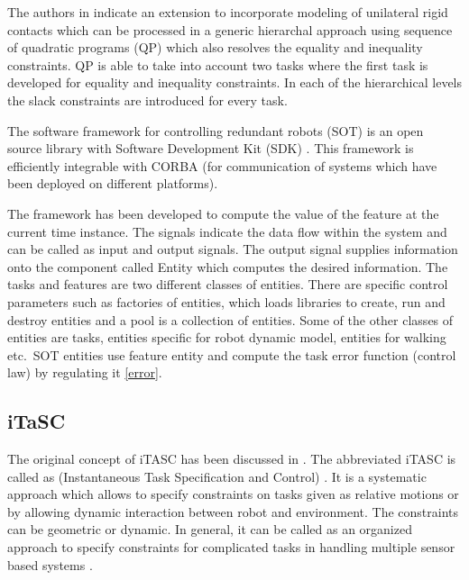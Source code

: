 The authors in \cite{saab2011generic} indicate an extension to incorporate modeling of unilateral rigid contacts which can be processed in a generic hierarchal approach using sequence of quadratic programs (QP) which also resolves the equality and inequality constraints. QP is able to take into account two tasks where the first task is developed for equality and inequality constraints. In each of the hierarchical levels the slack constraints are introduced for every task. 


The software framework for controlling redundant robots (SOT) is an open source library with Software Development Kit (SDK) \cite{mansard2009versatile}. This framework is efficiently integrable with CORBA (for communication of systems which have been deployed on different platforms). 


The framework has been developed to compute the value of the feature at the current time instance. The signals indicate the data flow within the system and can be called as input and output signals. The output signal supplies information onto the component called Entity which computes the desired information. The tasks and features are two different classes of entities. There are specific control parameters such as factories of entities, which loads libraries to create, run and destroy entities and a pool is a collection of entities. Some of the other classes of entities are tasks, entities specific for robot dynamic model, entities for walking etc.\ SOT entities use feature entity and compute the task error function (control law) by regulating it \ref{error}.
\subsection{iTaSC}
The original concept of iTASC has been discussed in \cite{smits2008itasc}.
The abbreviated iTASC is called as (Instantaneous Task Specification and Control) \cite{smits2008itasc}. It is a systematic approach which allows to specify constraints on tasks given as relative motions or by allowing dynamic interaction between robot and environment. The constraints can be geometric or dynamic. In general, it can be called as an organized approach to specify constraints for complicated tasks in handling multiple sensor based systems \cite{smits2008itasc}. 


